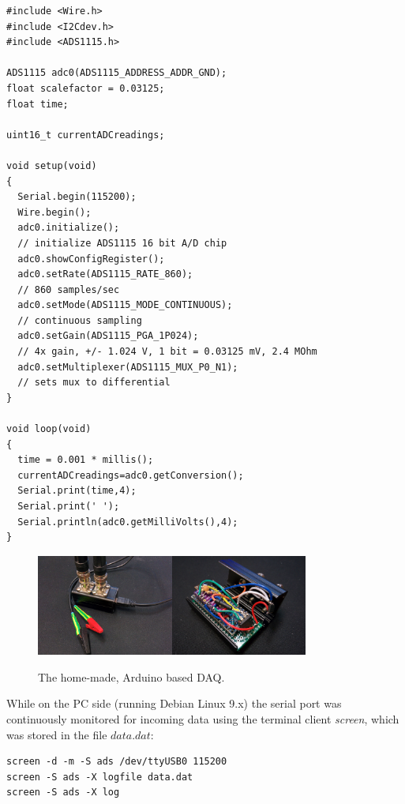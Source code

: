 \begin{lstlisting}
#include <Wire.h>
#include <I2Cdev.h>
#include <ADS1115.h>

ADS1115 adc0(ADS1115_ADDRESS_ADDR_GND); 
float scalefactor = 0.03125;
float time;

uint16_t currentADCreadings;  

void setup(void)
{
  Serial.begin(115200);  
  Wire.begin();
  adc0.initialize();
  // initialize ADS1115 16 bit A/D chip
  adc0.showConfigRegister();
  adc0.setRate(ADS1115_RATE_860);
  // 860 samples/sec
  adc0.setMode(ADS1115_MODE_CONTINUOUS);
  // continuous sampling
  adc0.setGain(ADS1115_PGA_1P024);
  // 4x gain, +/- 1.024 V, 1 bit = 0.03125 mV, 2.4 MOhm
  adc0.setMultiplexer(ADS1115_MUX_P0_N1);
  // sets mux to differential
}

void loop(void)
{  
  time = 0.001 * millis();
  currentADCreadings=adc0.getConversion(); 
  Serial.print(time,4);
  Serial.print(' ');
  Serial.println(adc0.getMilliVolts(),4);
} 
\end{lstlisting}

\begin{figure}
\centering
\includegraphics[width=0.4\textwidth]{img/daq1.jpg}\includegraphics[width=0.4\textwidth]{img/daq2.jpg}
\caption[The home-made, Arduino based DAQ.]{The home-made, Arduino based DAQ.}
\label{fig:daq}
\end{figure}

While on the PC side (running Debian Linux 9.x) the serial port was continuously monitored for incoming data using the terminal client \emph{screen}, which was stored in the file $data.dat$:

\begin{lstlisting}
screen -d -m -S ads /dev/ttyUSB0 115200
screen -S ads -X logfile data.dat
screen -S ads -X log
\end{lstlisting}


